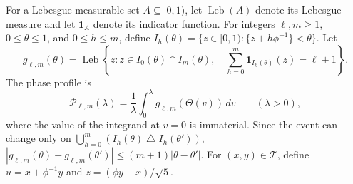 \documentclass[11pt]{amsart}
\theoremstyle{definition}
\newcommand{\Tcal}{\mathcal T}
\begin{document}
For a Lebesgue measurable set $A\subseteq[0,1)$, let
$\operatorname{Leb}(A)$ denote its Lebesgue measure and let
$\boldsymbol1_A$ denote its indicator function. For integers $\ell,m\geq1$, $0\leq\theta\leq1$, and
$0\leq h\leq m$, define $I_h(\theta)=\{z\in[0,1):\{z+h\phi^{-1}\}<\theta\}$. Let
\[
 g_{\ell,m}(\theta)=\operatorname{Leb}\left\{z:
 z\in I_0(\theta)\cap I_m(\theta),\quad
 \sum_{h=0}^m\boldsymbol1_{I_h(\theta)}(z)=\ell+1\right\}.
\]
The phase profile is
\begin{equation}\label{eq:phase-profile}
 \mathcal P_{\ell,m}(\lambda)
 =\frac1\lambda\int_0^\lambda g_{\ell,m}(\Theta(v))\,dv
 \qquad(\lambda>0),
\end{equation}
where the value of the integrand at $v=0$ is immaterial.  Since the event
can change only on
$\bigcup_{h=0}^m(I_h(\theta)\mathbin\triangle I_h(\theta'))$, $|g_{\ell,m}(\theta)-g_{\ell,m}(\theta')|\le(m+1)|\theta-\theta'|$.
For $(x,y)\in\Tcal$, define $u=x+\phi^{-1} y$ and $z=(\phi y-x)/\sqrt5$.
\end{document}
